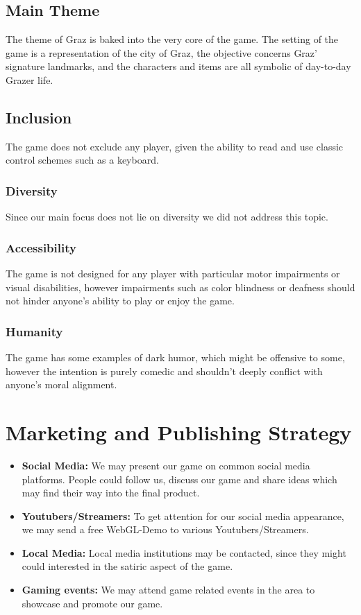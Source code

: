 \documentclass[a4paper]{scrreprt}
\begin{document}

\section{Main Theme}
The theme of Graz is baked into the very core of the game. The setting of the game is a representation of the city of Graz, the objective concerns Graz' signature landmarks, and the characters and items are all symbolic of day-to-day Grazer life.
\section{Inclusion}
The game does not exclude any player, given the ability to read and use classic control schemes such as a keyboard.
\subsection{Diversity}
Since our main focus does not lie on diversity we did not address this topic.
\subsection{Accessibility}
The game is not designed for any player with particular motor impairments or visual disabilities, however impairments such as color blindness or deafness should not hinder anyone's ability to play or enjoy the game.
\subsection{Humanity}
The game has some examples of dark humor, which might be offensive to some, however the intention is purely comedic and shouldn't deeply conflict with anyone's moral alignment.



\chapter{Marketing and Publishing Strategy}
 
 \begin{itemize}
     \item \textbf{Social Media:} We may present our game on common social media platforms. People could follow us, discuss our game and share ideas which may find their way into the final product. 
     \item \textbf{Youtubers/Streamers:} To get attention for our social media appearance,
we may send a free WebGL-Demo to various Youtubers/Streamers.
    \item \textbf{Local Media:} Local media institutions may be contacted, since they might could interested in the satiric aspect of the game.
    \item \textbf{Gaming events:} We may attend game related events in the area to showcase and promote our game.
 \end{itemize}
\end{document}
